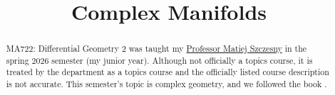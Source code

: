 \documentclass[11pt, letterpaper]{report}
\title{Complex Manifolds}
\begin{document}
    \maketitle

    \begin{abstract}
	    MA722: Differential Geometry 2 was taught my \href{https://math.bu.edu/people/szczesny/}{Professor Matiej Szczesny} in the spring 2026 semester (my junior year). Although not officially a topics course, it is treated by the department as a topics course and the officially listed course description is not accurate. This semester's topic is complex geometry, and we followed the book \cite{huybrechts}.
    \end{abstract}
    
    \tableofcontents
    
    
    
    
    
    
    
    
    
    
    
    
    
    
    
    
    
    
    
    
    
    
    
    
    
\end{document}
